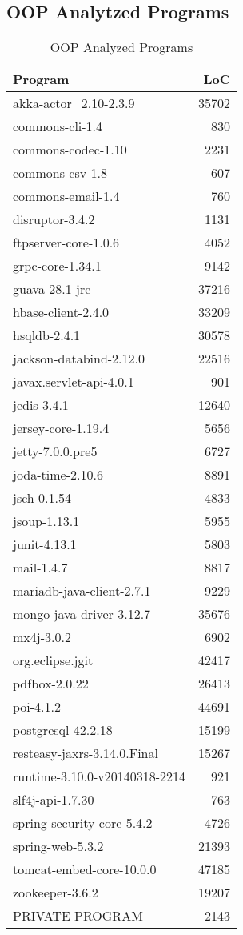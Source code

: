 \documentclass[12pt, a4paper]{article}
\begin{document}
\subsection{OOP Analytzed Programs}
\begin{longtable}[H]{l r}
    \caption{OOP Analyzed Programs}\label{table:ax_oop_prog_1}\\
        Program & LoC \\
        \hline            
        \endhead
        akka-actor\_2.10-2.3.9 & 35702 \\
        commons-cli-1.4 & 830 \\
        commons-codec-1.10 & 2231 \\
        commons-csv-1.8 & 607 \\
        commons-email-1.4 & 760 \\
        disruptor-3.4.2 & 1131 \\
        ftpserver-core-1.0.6 & 4052 \\
        grpc-core-1.34.1 & 9142 \\
        guava-28.1-jre & 37216 \\
        hbase-client-2.4.0 & 33209 \\
        hsqldb-2.4.1 & 30578 \\
        jackson-databind-2.12.0 & 22516 \\
        javax.servlet-api-4.0.1 & 901 \\
        jedis-3.4.1 & 12640 \\
        jersey-core-1.19.4 & 5656 \\
        jetty-7.0.0.pre5 & 6727 \\
        joda-time-2.10.6 & 8891 \\
        jsch-0.1.54 & 4833 \\
        jsoup-1.13.1 & 5955 \\
        junit-4.13.1 & 5803 \\
        mail-1.4.7 & 8817 \\
        mariadb-java-client-2.7.1 & 9229 \\
        mongo-java-driver-3.12.7 & 35676 \\
        mx4j-3.0.2 & 6902 \\
        org.eclipse.jgit & 42417 \\
        pdfbox-2.0.22 & 26413 \\
        poi-4.1.2 & 44691 \\
        postgresql-42.2.18 & 15199 \\
        resteasy-jaxrs-3.14.0.Final & 15267 \\
        runtime-3.10.0-v20140318-2214 & 921 \\
        slf4j-api-1.7.30 & 763 \\
        spring-security-core-5.4.2 & 4726 \\
        spring-web-5.3.2 & 21393 \\
        tomcat-embed-core-10.0.0 & 47185 \\
        zookeeper-3.6.2 & 19207 \\
        PRIVATE PROGRAM & 2143
\end{longtable}
\end{document}
